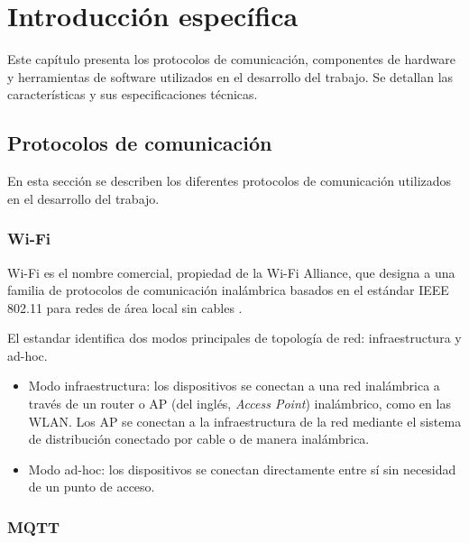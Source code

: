 \chapter{Introducción específica}

Este capítulo presenta los protocolos de comunicación, componentes de hardware
y herramientas de software utilizados en el desarrollo del trabajo. Se detallan
las características y sus especificaciones técnicas.


\section{Protocolos de comunicación}

En esta sección se describen los diferentes protocolos de comunicación
utilizados en el desarrollo del trabajo.

\subsection{Wi-Fi}

Wi-Fi es el nombre comercial, propiedad de la Wi-Fi Alliance, que designa a una
familia de protocolos de comunicación inalámbrica basados en el estándar IEEE
802.11 para redes de área local sin cables \cite{Li2019}.

El estandar identifica dos modos principales de topología de red:
infraestructura y ad-hoc.

\begin{itemize}
	\item Modo infraestructura: los dispositivos se conectan a una red inalámbrica a
	      través de un router o AP (del inglés, \textit{Access Point}) inalámbrico, como
	      en las WLAN. Los AP se conectan a la infraestructura de la red mediante el
	      sistema de distribución conectado por cable o de manera inalámbrica.
	\item Modo ad-hoc: los dispositivos se conectan directamente entre sí sin necesidad
	      de un punto de acceso.
\end{itemize}

\subsection{MQTT}

